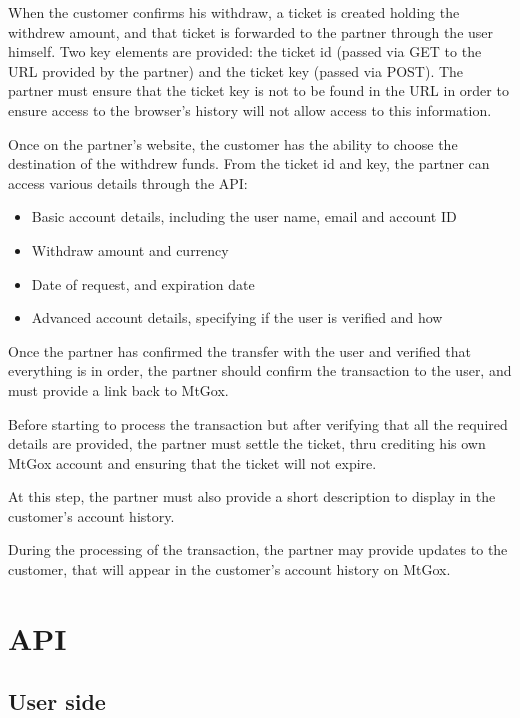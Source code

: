 \documentclass[a4paper,12pt]{article}
\begin{document}
When the customer confirms his withdraw, a ticket is created holding the
withdrew amount, and that ticket is forwarded to the partner through the user
himself. Two key elements are provided: the ticket id (passed via GET to the
URL provided by the partner) and the ticket key (passed via POST). The partner
must ensure that the ticket key is not to be found in the URL in order to
ensure access to the browser's history will not allow access to this
information.

Once on the partner's website, the customer has the ability to choose the
destination of the withdrew funds. From the ticket id and key, the partner
can access various details through the API:

\begin{itemize}
\item Basic account details, including the user name, email and account ID
\item Withdraw amount and currency
\item Date of request, and expiration date
\item Advanced account details, specifying if the user is verified and how
\end{itemize}

Once the partner has confirmed the transfer with the user and verified that
everything is in order, the partner should confirm the transaction to the
user, and must provide a link back to MtGox.

Before starting to process the transaction but after verifying that all the
required details are provided, the partner must settle the ticket, thru
crediting his own MtGox account and ensuring that the ticket will not expire.

At this step, the partner must also provide a short description to display
in the customer's account history.

During the processing of the transaction, the partner may provide updates
to the customer, that will appear in the customer's account history on
MtGox.

\section{API}

\subsection{User side}
\end{document}
